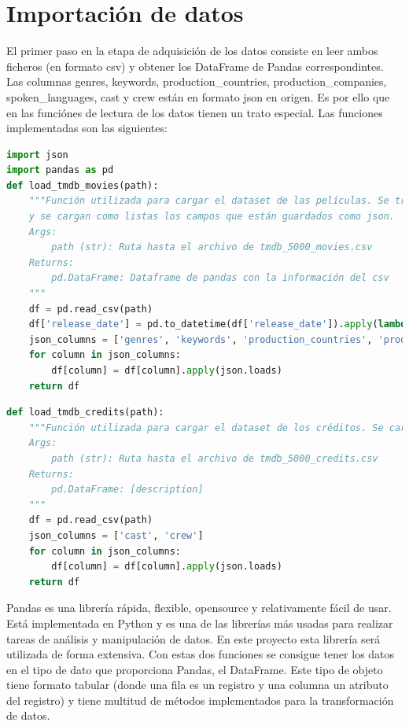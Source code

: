 \section{Importación de datos}

El primer paso en la etapa de adquisición de los datos consiste en leer ambos ficheros (en formato csv) y obtener los DataFrame de Pandas correspondintes. Las columnas genres, keywords, production\_countries, production\_companies, spoken\_languages, cast y crew están en formato json en origen. Es por ello que en las funciónes de lectura de los datos tienen un trato especial. Las funciones implementadas son las siguientes:

\begin{lstlisting}[language=Python, caption=Lectura de los datos del fichero de películas.]
import json
import pandas as pd
def load_tmdb_movies(path):
    """Función utilizada para cargar el dataset de las películas. Se transforma a fecha el campo de fecha de salida
    y se cargan como listas los campos que están guardados como json.
    Args:
        path (str): Ruta hasta el archivo de tmdb_5000_movies.csv
    Returns:
        pd.DataFrame: Dataframe de pandas con la información del csv
    """
    df = pd.read_csv(path)
    df['release_date'] = pd.to_datetime(df['release_date']).apply(lambda x: x.date())
    json_columns = ['genres', 'keywords', 'production_countries', 'production_companies', 'spoken_languages']
    for column in json_columns:
        df[column] = df[column].apply(json.loads)
    return df
\end{lstlisting}

\begin{lstlisting}[language=Python, caption=Lectura de los datos del fichero de créditos.]
def load_tmdb_credits(path):
    """Función utilizada para cargar el dataset de los créditos. Se cargan como listas los campos que están guardado
    Args:
        path (str): Ruta hasta el archivo de tmdb_5000_credits.csv
    Returns:
        pd.DataFrame: [description]
    """
    df = pd.read_csv(path)
    json_columns = ['cast', 'crew']
    for column in json_columns:
        df[column] = df[column].apply(json.loads)
    return df
\end{lstlisting}

Pandas es una librería rápida, flexible, opensource y relativamente fácil de usar. Está implementada en Python y es una de las librerías más usadas para realizar tareas de análisis y manipulación de datos. En este proyecto esta librería será utilizada de forma extensiva. Con estas dos funciones se consigue tener los datos en el tipo de dato que proporciona Pandas, el DataFrame. Este tipo de objeto tiene formato tabular (donde una fila es un registro y una columna un atributo del registro) y tiene multitud de métodos implementados para la transformación de datos.\\

